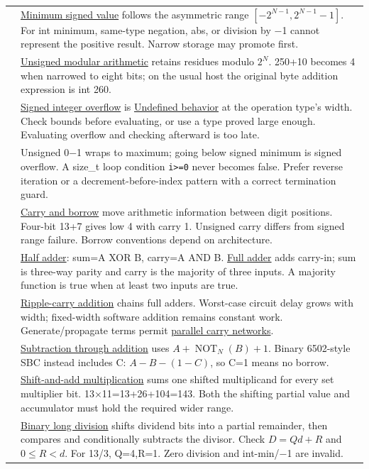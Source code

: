 {\begin{longtable}[]{@{}
  >{\raggedright\arraybackslash}p{}
  >{\raggedright\arraybackslash}p{}@{}}
27 & \hyperref[appendix-05f39b10364d]{Minimum signed value} follows the asymmetric range \([-2^{N-1},2^{N-1}-1]\). For int minimum, same-type negation, abs, or division by −1 cannot represent the positive result. Narrow storage may promote first. \\
28 & \hyperref[appendix-c99977d88b33]{Unsigned modular arithmetic} retains residues modulo \(2^N\). 250+10 becomes 4 when narrowed to eight bits; on the usual host the original byte addition expression is int 260. \\
29 & \hyperref[appendix-1a599c924a4e]{Signed integer overflow} is \hyperref[appendix-f558f5b4d8f2]{Undefined behavior} at the operation type's width. Check bounds before evaluating, or use a type proved large enough. Evaluating overflow and checking afterward is too late. \\
30 & Unsigned 0−1 wraps to maximum; going below signed minimum is signed overflow. A size\_t loop condition \texttt{i\textgreater{}=0} never becomes false. Prefer reverse iteration or a decrement-before-index pattern with a correct termination guard. \\
31 & \hyperref[appendix-d52d5f78ffd1]{Carry and borrow} move arithmetic information between digit positions. Four-bit 13+7 gives low 4 with carry 1. Unsigned carry differs from signed range failure. Borrow conventions depend on architecture. \\
32 & \hyperref[appendix-1652d27a8e90]{Half adder}: sum=A XOR B, carry=A AND B. \hyperref[appendix-d1a5b1e520c2]{Full adder} adds carry-in; sum is three-way parity and carry is the majority of three inputs. A majority function is true when at least two inputs are true. \\
33 & \hyperref[appendix-17917d9fdbe3]{Ripple-carry addition} chains full adders. Worst-case circuit delay grows with width; fixed-width software addition remains constant work. Generate/propagate terms permit \hyperref[appendix-b5c46b2d94ff]{parallel carry networks}. \\
34 & \hyperref[appendix-1c7df340573e]{Subtraction through addition} uses \(A+\operatorname{NOT}_N(B)+1\). Binary 6502-style SBC instead includes C: \(A-B-(1-C)\), so C=1 means no borrow. \\
35 & \hyperref[appendix-a65290d66ed9]{Shift-and-add multiplication} sums one shifted multiplicand for every set multiplier bit. 13×11=13+26+104=143. Both the shifting partial value and accumulator must hold the required wider range. \\
36 & \hyperref[appendix-89985e6a2685]{Binary long division} shifts dividend bits into a partial remainder, then compares and conditionally subtracts the divisor. Check \(D=Qd+R\) and \(0\le R<d\). For 13/3, Q=4,R=1. Zero division and int-min/−1 are invalid. \\

\end{longtable}}

